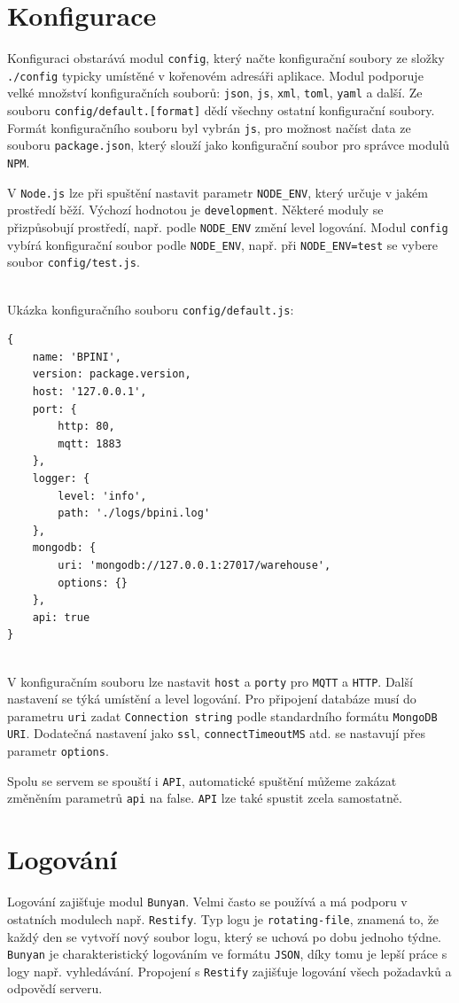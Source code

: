 \documentclass[czech,BP]{thesiskiv}
\begin{document}
	
	
\section{Konfigurace}
		Konfiguraci obstarává modul \texttt{config}, který načte konfigurační soubory ze složky \texttt{./config} typicky umístěné v kořenovém adresáři aplikace. 	
		Modul podporuje velké množství konfiguračních souborů: \texttt{json}, \texttt{js}, \texttt{xml}, \texttt{toml}, \texttt{yaml} a další.
		Ze souboru \texttt{config/default.[format]} dědí všechny ostatní konfigurační soubory.
		Formát konfiguračního souboru byl vybrán \texttt{js}, pro možnost načíst data ze souboru \texttt{package.json}, který slouží jako konfigurační soubor pro správce modulů \texttt{NPM}.	
			
		V \texttt{Node.js} lze při spuštění nastavit parametr \texttt{NODE\_ENV}, který určuje v jakém prostředí běží. Výchozí hodnotou je \texttt{development}.
		Některé moduly se přizpůsobují prostředí, např. podle \texttt{NODE\_ENV} změní level logování. 
		Modul \texttt{config} vybírá konfigurační soubor podle \texttt{NODE\_ENV}, např. při \texttt{NODE\_ENV=test} se vybere soubor \texttt{config/test.js}.

\ \\
		Ukázka konfiguračního souboru \texttt{config/default.js}:	
\begingroup
\fontsize{10pt}{12pt}\selectfont		
\begin{verbatim}
{
    name: 'BPINI',
    version: package.version,
    host: '127.0.0.1',
    port: {
        http: 80,
        mqtt: 1883
    },
    logger: {
        level: 'info',
        path: './logs/bpini.log'
    },
    mongodb: {
        uri: 'mongodb://127.0.0.1:27017/warehouse',
        options: {}
    },
    api: true
}
\end{verbatim}
\endgroup
\ \\
	V konfiguračním souboru lze nastavit  \texttt{host} a  \texttt{porty} pro \texttt{MQTT} a \texttt{HTTP}. Další nastavení se týká umístění a level logování. Pro připojení databáze musí do parametru \texttt{uri} zadat \texttt{Connection string} podle standardního formátu \texttt{MongoDB URI}. Dodatečná nastavení jako \texttt{ssl}, \texttt{connectTimeoutMS} atd. se nastavují přes parametr \texttt{options}. 
	
	Spolu se servem se spouští i \texttt{API}, automatické spuštění můžeme zakázat změněním parametrů \texttt{api} na false. \texttt{API} lze také spustit zcela samostatně.	
	
	
	\section{Logování}
	Logování zajišťuje modul \texttt{Bunyan}. Velmi často se používá a má podporu v ostatních modulech např. \texttt{Restify}.
	Typ logu je \texttt{rotating-file}, znamená to, že každý den se vytvoří nový soubor logu, který se uchová po dobu jednoho týdne.
	\texttt{Bunyan} je charakteristický logováním ve formátu \texttt{JSON}, díky tomu je lepší práce s logy např. vyhledávání.
	Propojení s \texttt{Restify} zajišťuje logování všech požadavků a odpovědí serveru. 
	
\end{document}
